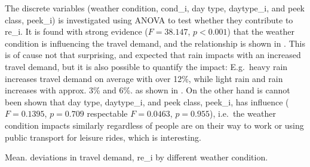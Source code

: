The discrete variables (weather condition, \gls{cond_i}, day type, \gls{daytype_i}, and peek class, \gls{peek_i}) is investigated using ANOVA to test whether they contribute to \gls{re_i}. It is found with strong evidence ($F = 38.147$, $p < 0.001$) that the weather condition is influencing the travel demand, and the relationship is shown in . This is of cause not that surprising, and expected that rain impacts with an increased travel demand, but it is also possible to quantify the impact: E.g.\ heavy rain increases travel demand on average with over 12\%, while light rain and rain increases with approx. 3\% and 6\%. as shown in . On the other hand is cannot been shown that day type, \gls{daytype_i}, and peek class, \gls{peek_i}, has influence ($F =  0.1395$, $p = 0.709$ respectable $F =  0.0463$, $p = 0.955$), i.e.\ the weather condition impacts similarly regardless of people are on their way to work or using public transport for leisure rides, which is interesting.
\begin{table}[!ht]
    \center
    
    \caption{Mean. deviations in travel demand, \gls{re_i} by different weather condition.}
    \label{tab:mean_cond_tab}
\end{table}

